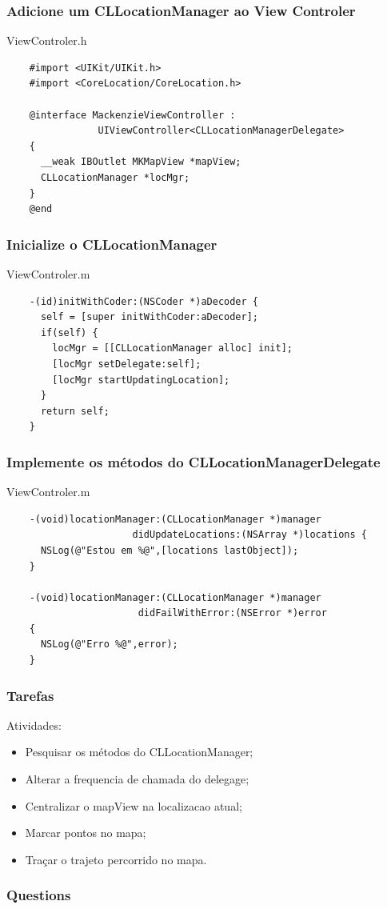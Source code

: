 \documentclass[serif,mathserif]{beamer}
\begin{document}
\begin{frame}[fragile]
  \frametitle{Adicione um CLLocationManager ao View Controler}
  ViewControler.h
  \lstset{language=[Objective]C, breakindent=40pt, breaklines}
  \begin{lstlisting}
    #import <UIKit/UIKit.h>
    #import <CoreLocation/CoreLocation.h>

    @interface MackenzieViewController :
                UIViewController<CLLocationManagerDelegate>
    {
      __weak IBOutlet MKMapView *mapView;
      CLLocationManager *locMgr;
    }
    @end
  \end{lstlisting}
\end{frame}


\begin{frame}[fragile]
  \frametitle{Inicialize o CLLocationManager}
  ViewControler.m
  \lstset{language=[Objective]C, breakindent=40pt, breaklines}
  \begin{lstlisting}
    -(id)initWithCoder:(NSCoder *)aDecoder {
      self = [super initWithCoder:aDecoder];
      if(self) {
        locMgr = [[CLLocationManager alloc] init];
        [locMgr setDelegate:self];
        [locMgr startUpdatingLocation];
      }
      return self;
    }
  \end{lstlisting}
\end{frame}


\begin{frame}[fragile]
  \frametitle{Implemente os métodos do CLLocationManagerDelegate}
  ViewControler.m
  \lstset{language=[Objective]C, breakindent=40pt, breaklines}
  \begin{lstlisting}
    -(void)locationManager:(CLLocationManager *)manager
                      didUpdateLocations:(NSArray *)locations {
      NSLog(@"Estou em %@",[locations lastObject]);
    }
    
    -(void)locationManager:(CLLocationManager *)manager
                       didFailWithError:(NSError *)error
    {
      NSLog(@"Erro %@",error);
    }

  \end{lstlisting}
\end{frame}





\begin{frame}
  \frametitle{Tarefas}
  Atividades:
  \begin{itemize}
  \item Pesquisar os métodos do CLLocationManager; 
  \item Alterar a frequencia de chamada do delegage;
  \item Centralizar o mapView na localizacao atual;
  \item Marcar pontos no mapa;
  \item Traçar o trajeto percorrido no mapa.
  \end{itemize}
\end{frame}





\begin{frame}
  \frametitle{Questions}
\end{frame}
\end{document}

